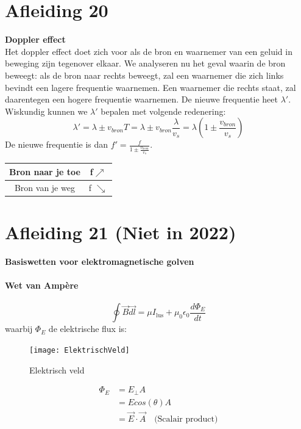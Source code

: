 \documentclass[a4paper,kul]{kulakarticle} %
\begin{document}
\newpage
\section{Afleiding 20}
\textbf{Doppler effect}\\
Het doppler effect doet zich voor als de bron en waarnemer van een geluid in beweging zijn tegenover elkaar. We analyseren nu het geval waarin de bron beweegt: als de bron naar rechts beweegt,  zal een waarnemer die zich links bevindt een lagere frequentie waarnemen. Een waarnemer die rechts staat, zal daarentegen een hogere frequentie waarnemen. De nieuwe frequentie heet $\lambda'$. Wiskundig kunnen we $\lambda'$ bepalen met volgende redenering:
\begin{equation*}
	\lambda'=\lambda\pm v_{bron}T=\lambda\pm v_{bron}\frac{\lambda}{v_s}=\lambda(1\pm\frac{v_{bron}}{v_s})
\end{equation*}
De nieuwe frequentie is dan $f'=\frac{f}{1\pm\frac{v_{bron}}{v_s}}$.
\begin{center}
	\begin{tabular}{|c|c|}
		\hline
		Bron naar je toe  & f$\nearrow$ \\
		\hline
		Bron van je weg & f $\searrow$\\
		\hline
	\end{tabular}
	
\end{center}
\newpage
\section{Afleiding 21 (Niet in 2022)}
\textbf{Basiswetten voor elektromagnetische golven}\\
\paragraph{Wet van Ampère}
\begin{equation*}
	\oint\vec{B}\vec{dl}=\mu I_{\text{lus}}+\mu_0\epsilon_0\frac{d\Phi_E}{dt}
\end{equation*}
waarbij $\Phi_E$ de elektrische flux is:
\begin{figure}[h]
	\centering
	\texttt{[image: ElektrischVeld]}
	\caption[Elektrisch veld]{Elektrisch veld}
	\label{fig:elektrischveld}
\end{figure}
\begin{align*}
	\Phi_E &= E_{\perp}A\\
	&= Ecos(\theta)A\\
	&= \vec{E}\cdot\vec{A}\quad\text{(Scalair product)}
\end{align*}
\end{document}
